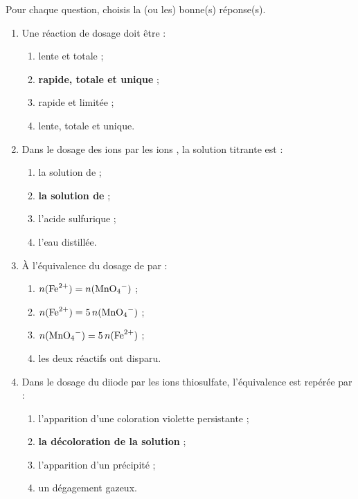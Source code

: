 \documentclass[11pt]{article}
\begin{document}
\begin{exercice}
Pour chaque question, choisis la (ou les) bonne(s) réponse(s).
\begin{enumerate}
\item Une réaction de dosage doit être :
\begin{enumerate}
\item lente et totale ;
\item \textbf{rapide, totale et unique} ;
\item rapide et limitée ;
\item lente, totale et unique.
\end{enumerate}
\item Dans le dosage des ions  par les ions , la solution titrante est :
\begin{enumerate}
\item la solution de  ;
\item \textbf{la solution de } ;
\item l'acide sulfurique ;
\item l'eau distillée.
\end{enumerate}
\item À l'équivalence du dosage de  par  :
\begin{enumerate}
\item $n(\ce{Fe^2+}) = n(\ce{MnO4-})$ ;
\item \textbf{$n(\ce{Fe^2+}) = 5\,n(\ce{MnO4-})$} ;
\item $n(\ce{MnO4-}) = 5\,n(\ce{Fe^2+})$ ;
\item les deux réactifs ont disparu.
\end{enumerate}
\item Dans le dosage du diiode par les ions thiosulfate, l'équivalence est repérée par :
\begin{enumerate}
\item l'apparition d'une coloration violette persistante ;
\item \textbf{la décoloration de la solution} ;
\item l'apparition d'un précipité ;
\item un dégagement gazeux.
\end{enumerate}
\end{enumerate}
\end{exercice}
\end{document}
